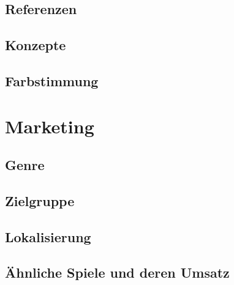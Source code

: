 \documentclass[envcountsame,envcountchap deutsch]{i-studis}
\begin{document}
\section{Referenzen}
\section{Konzepte}
\section{Farbstimmung}
\chapter{Marketing}
\section{Genre}
\section{Zielgruppe}
\section{Lokalisierung}
\section{Ähnliche Spiele und deren Umsatz}
%



\begin{appendix}
\end{appendix}
\end{document}
